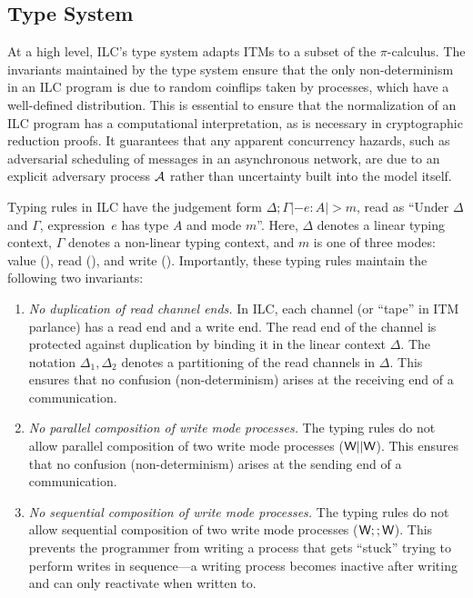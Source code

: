 

\subsection{Type System}
\label{subsec:types}







At a high level, ILC's type system adapts ITMs to a subset of the $\pi$-calculus.
The invariants maintained by the type system ensure that the only
non-determinism in an ILC program is due to random coinflips taken by processes,
which have a well-defined distribution. This is essential to ensure that the
normalization of an ILC program has a computational interpretation, as is
necessary in cryptographic reduction proofs. It guarantees that any apparent
concurrency hazards, such as adversarial scheduling of messages in an
asynchronous network, are due to an explicit adversary process $\mathcal{{A}}$ rather
than uncertainty built into the model itself.

Typing rules in ILC have the judgement form $\Delta ; \Gamma |- e : A |> m$, read as
``Under $\Delta$ and $\Gamma$, expression~$e$ has type $A$ and mode $m$''.  Here, $\Delta$
denotes a linear typing context, $\Gamma$ denotes a non-linear typing context, and
$m$ is one of three modes: value (\Vm), read (\Rm), and write
(\Wm). Importantly, these typing rules maintain the following two invariants:

\begin{enumerate}
\item \emph{No duplication of read channel ends.} In ILC, each channel (or
  ``tape'' in ITM parlance) has a read end and a write end. The read end of the
  channel is protected against duplication by binding it in the linear context
  $\Delta$. The notation $\Delta_1, \Delta_2$ denotes a partitioning of the read channels in
  $\Delta$. This ensures that no confusion (non-determinism) arises at the receiving
  end of a communication.

\item \emph{No parallel composition of write mode processes.} The typing rules
  do not allow parallel composition of two write mode processes ($\textsf{W} ||
  \textsf{W}$). This ensures that no confusion (non-determinism) arises at the sending
  end of a communication.

\item \emph{No sequential composition of write mode processes.} The typing rules
  do not allow sequential composition of two write mode processes ($\textsf{W} ;;
  \textsf{W}$). This prevents the programmer from writing a process that gets ``stuck''
  trying to perform writes in sequence---a writing process becomes inactive after
  writing and can only reactivate when written to.
\end{enumerate}

